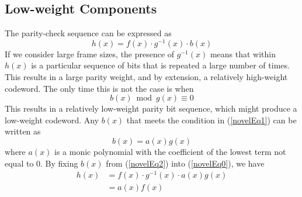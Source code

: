 \subsection{Low-weight Components}

The parity-check sequence can be expressed as 
\begin{equation}
h(x) =f(x)\cdot g^{-1}(x)\cdot b(x)
\label{novelEq0}
\end{equation}
If we consider large frame sizes, the presence of $g^{-1}(x)$ means that within $h(x)$ is a particular sequence of bits that is repeated a large number of times. This results in a large parity weight, and by extension, a relatively high-weight codeword. The only time this is not the case is when
\begin{equation}
b(x) \bmod g(x) \equiv 0
\label{novelEq1}
\end{equation}
This results in a relatively low-weight parity bit sequence, which might produce a low-weight codeword. Any $b(x)$ that meets the condition in (\ref{novelEq1}) can be written as 
\begin{equation}
b(x) =a(x)g(x)
\label{novelEq2}
\end{equation}
where $a(x)$ is a monic polynomial with the coefficient of the lowest term not equal to $0$.
By fixing $b(x)$ from (\ref{novelEq2}) into (\ref{novelEq0}), we have 
\begin{equation}
\begin{split}
h(x)&=f(x)\cdot g^{-1}(x)\cdot a(x)g(x)\\
&=a(x)f(x)
\end{split}
\label{novelEq3}
\end{equation}

